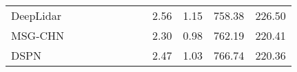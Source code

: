 \documentclass[letterpaper, 10 pt, conference]{ieeeconf}  \usepackage{geometry}
\begin{document}
\begin{table*}[t]
{\begin{tabular}{@{}lccccccccccc@{}}
			\multicolumn{1}{l|}{DeepLidar \cite{DeepLidar_synthdata}}                        & \multicolumn{1}{c|}{\checkmark}                                                        & \multicolumn{1}{c|}{\checkmark}                                                              & \multicolumn{1}{c|}{}                                                            & \multicolumn{1}{c|}{\checkmark}              & \multicolumn{1}{c|}{}                 & \multicolumn{1}{c|}{\checkmark}                                                              & \multicolumn{1}{c|}{\checkmark}                                                                & 2.56                                                                                 & 1.15                                                                                & 758.38                                                                            & 226.50                                                      \\
			\multicolumn{1}{l|}{MSG-CHN \cite{MSG-CHN}}                          & \multicolumn{1}{c|}{\checkmark}                                                        & \multicolumn{1}{c|}{\checkmark}                                                              & \multicolumn{1}{c|}{}                                                            & \multicolumn{1}{c|}{}                 & \multicolumn{1}{c|}{}                 & \multicolumn{1}{c|}{}                                                                 & \multicolumn{1}{c|}{}                                                                   & 2.30                                                                                 & 0.98                                                                                & 762.19                                                                            & 220.41                                                      \\
			\multicolumn{1}{l|}{DSPN \cite{DefSPN}}                             & \multicolumn{1}{c|}{\checkmark}                                                        & \multicolumn{1}{c|}{\checkmark}                                                              & \multicolumn{1}{c|}{}                                                            & \multicolumn{1}{c|}{\checkmark}              & \multicolumn{1}{c|}{\checkmark}              & \multicolumn{1}{c|}{}                                                                 & \multicolumn{1}{c|}{}                                                                   & 2.47                                                                                 & 1.03                                                                                & 766.74                                                                            & 220.36                                                      \\

\end{tabular}}
\end{table*}
\end{document}
